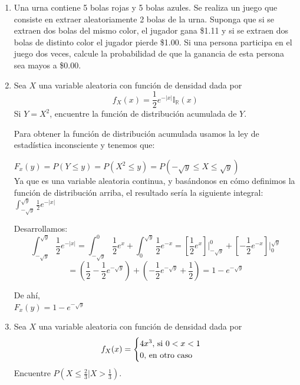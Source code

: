 \documentclass[12pt,a4paper]{report}
\begin{document}
\begin{enumerate}
		\item {
			Una urna contiene 5 bolas rojas y 5 bolas azules. Se realiza un juego
			que consiste en extraer aleatoriamente 2 bolas de la urna. Suponga que
			si se extraen dos bolas del mismo color, el jugador gana \$1.11 y si se
			extraen dos bolas de distinto color el jugador pierde \$1.00. Si una
			persona participa en el juego dos veces, calcule la probabilidad de que
			la ganancia de esta persona sea mayos a \$0.00.
		}

		\item {
			Sea $X$ una variable aleatoria con función de densidad dada por
			\[f_X(x) = \frac{1}{2}e^{-|x|}\mathbb{I}_{\mathbb{R}}(x)\]
			Si $Y = X^2$, encuentre la función de distribución acumulada de $Y$.
			
			Para obtener la función de distribución acumulada usamos la ley de estadística inconsciente y tenemos que:
			
		$F_{x}(y) = P(Y \leq y) = P(X^2\leq y) = P(-\sqrt{y} \leq X \leq \sqrt{y})$	\\
					
			Ya que es una variable aleatoria continua, y basándonos en cómo definimos la función de distribución arriba, el resultado sería la siguiente integral:
			$\int_{-\sqrt{y}}^{\sqrt{y}} \frac{1}{2}e^{-|x|}$			
			
			Desarrollamos:
			 \[
               \int_{-\sqrt{y}}^{\sqrt{y}} \frac{1}{2}e^{-|x|}
                =
                 \int_{-\sqrt{y}}^{0} \frac{1}{2}e^{x} 
                 +
                 \int_{0}^{\sqrt{y}} \frac{1}{2}e^{-x}
                =
                 \left[\frac{1}{2}e^{x}\right]\Big|_{-\sqrt{y}}^{0}
                 +
                 \left[-\frac{1}{2}e^{-x}\right]\Big|_{0}^{\sqrt{y}}
             \]        
             \[
                           =
                \left(\frac{1}{2} - \frac{1}{2}e^{-\sqrt{y}}\right)
                +
                \left(- \frac{1}{2}e^{-\sqrt{y}} + \frac{1}{2}\right)
                =
                1 - e^{-\sqrt{y}}
            \]        
            
            De ahí,\\
            $F_{x}(y) =  1 - e^{-\sqrt{y}}$\\
		}
		
		\item {
			Sea $X$ una variable aleatoria con función de densidad dada por
			\[
				f_X(x) = \begin{cases}
									4x^3, $ si $ 0 < x < 1\\
									0, $ en otro caso$
								 \end{cases}
			\]
			Encuentre $P(X \leq \frac{2}{3}|X > \frac{1}{3})$.\\
			
}
\end{enumerate}
\end{document}
